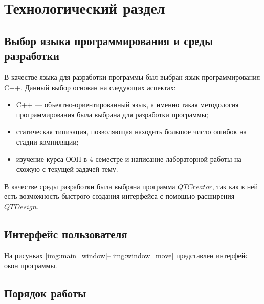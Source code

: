 \chapter{Технологический раздел}

\section{Выбор языка программирования и среды разработки}

В качестве языка для разработки программы был выбран язык программирования C++. Данный выбор основан на следующих аспектах:
\begin{itemize}[label=---]
    \item C++ --- объектно-ориентированный язык, а именно такая методология программирования была выбрана для разработки программы;
    \item статическая типизация, позволяющая находить большое число ошибок на стадии компиляции;
    \item изучение курса ООП в 4 семестре и написание лабораторной работы на схожую с текущей задачей тему.
\end{itemize}

В качестве среды разработки была выбрана программа $QT Creator$, так как в ней есть возможность быстрого создания интерфейса с помощью расширения $QTDesign$.

\section{Интерфейс пользователя}

На рисунках \ref{img:main_window}--\ref{img:window_move} представлен интерфейс окон программы.

\FloatBarrier
{}
\FloatBarrier
{}
\FloatBarrier
{}
\FloatBarrier
{}
\FloatBarrier
{}
\FloatBarrier
{}
\FloatBarrier
{}
\FloatBarrier
{}
\FloatBarrier
{}
\FloatBarrier
{}
\FloatBarrier

\section{Порядок работы}

